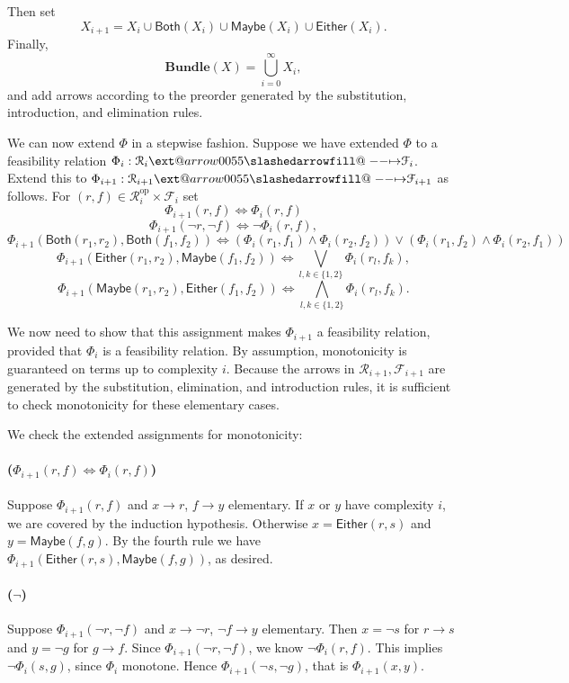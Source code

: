 \documentclass[12pt]{article}
\makeatletter
\theoremstyle{definition}
\theoremstyle{plain}
\theoremstyle{plain}
\theoremstyle{plain}
\theoremstyle{plain}
\theoremstyle{remark}
\theoremstyle{remark}
\newcommand{\mc}[1]{\mathcal{#1}}
\newcommand{\maybe}{\mathsf{Maybe}}
\newcommand{\either}{\mathsf{Either}}
\newcommand{\both}{\mathsf{Both}}
\def\slashedarrowfill@#1#2#3#4#5{%
	$\m@th\thickmuskip0mu\medmuskip\thickmuskip\thinmuskip\thickmuskip
	\relax#5#1\mkern-7mu%
	\cleaders\hbox{$#5\mkern-2mu#2\mkern-2mu$}\hfill
	\mathclap{#3}\mathclap{#2}%
	\cleaders\hbox{$#5\mkern-2mu#2\mkern-2mu$}\hfill
	\mkern-7mu#4$%
}
\def\rightslashedarrowfill@{%
	\slashedarrowfill@\relbar\relbar\mapstochar\rightarrow}
\newcommand\xslashedrightarrow[2][]{%
	\ext@arrow 0055{\rightslashedarrowfill@}{#1}{#2}}
\makeatother
\begin{document}
Then set $$X_{i+1} = X_i \cup \both(X_i) \cup \maybe(X_i) \cup \either(X_i).$$ Finally, $$\mathbf{Bundle}(X) = \bigcup_{i=0}^{\infty} X_i,$$
and add arrows according to the preorder generated by the substitution, introduction, and elimination rules.

We can now extend $\Phi$ in a stepwise fashion. Suppose we have extended $\Phi$ to a feasibility relation $\Phi_i: \mc{R}_i \xslashedrightarrow{} \mc{F}_i$. Extend this to $\Phi_{i+1}: \mc{R}_{i+1} \xslashedrightarrow{} \mc{F}_{i+1}$ as follows. For $(r,f) \in \mc{R}_i^{\text{op}} \times \mc{F}_i$ set 
$$\Phi_{i+1}(r,f) \Leftrightarrow \Phi_i(r,f)$$ 
$$\Phi_{i+1}(\neg r, \neg f)  \Leftrightarrow \neg \Phi_i(r,f),$$
$$\Phi_{i+1}(\both(r_1,r_2),\both(f_1,f_2)) \Leftrightarrow (\Phi_i(r_1,f_1) \wedge \Phi_i(r_2,f_2)) \vee (\Phi_i(r_1,f_2) \wedge \Phi_i(r_2,f_1))$$
$$\Phi_{i+1}(\either(r_1,r_2),\maybe(f_1,f_2)) \Leftrightarrow \bigvee_{l,k \in \{1,2\}}\Phi_i(r_l,f_k) , $$
$$\Phi_{i+1}(\maybe(r_1,r_2),\either(f_1,f_2)) \Leftrightarrow \bigwedge_{l,k \in \{1,2\}}\Phi_i(r_l,f_k). $$

We now need to show that this assignment makes $\Phi_{i+1}$ a feasibility relation, provided that $\Phi_i$ is a feasibility relation. By assumption, monotonicity is guaranteed on terms up to complexity $i$. Because the arrows in $\mc{R}_{i+1}, \mc{F}_{i+1}$ are generated by the substitution, elimination, and introduction rules, it is sufficient to check monotonicity for these elementary cases.

We check the extended assignments for monotonicity:

\paragraph{($\Phi_{i+1}(r,f) \Leftrightarrow \Phi_i(r,f)$)} Suppose $\Phi_{i+1}(r,f)$ and $x \rightarrow r$, $f \rightarrow y$ elementary. If $x$ or $y$ have complexity $i$, we are covered by the induction hypothesis. Otherwise $x = \either(r,s)$ and $y = \maybe(f,g)$. By the fourth rule we have $\Phi_{i+1}(\either(r,s),\maybe(f,g))$, as desired.

\paragraph{($\neg$)} Suppose $\Phi_{i+1}(\neg r, \neg f)$ and $x \rightarrow \neg r$, $\neg f \rightarrow y$ elementary. Then $x = \neg s$ for $r \rightarrow s$ and $y = \neg g$ for $g \rightarrow f$. Since $\Phi_{i+1}(\neg r, \neg f)$, we know $\neg \Phi_i(r,f)$. This implies $\neg \Phi_i(s,g)$, since $\Phi_i$ monotone. Hence $\Phi_{i+1}(\neg s, \neg g)$, that is $\Phi_{i+1}(x,y)$.
\end{document}
